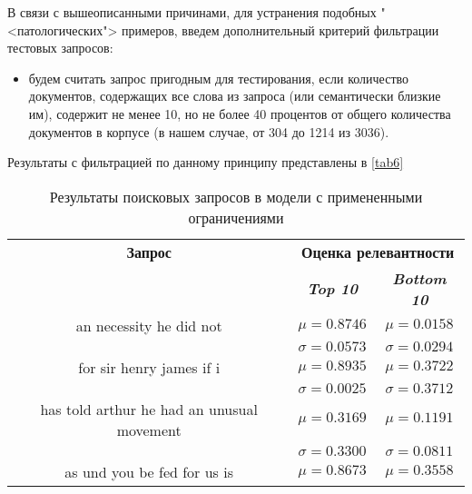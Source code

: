 В связи с вышеописанными причинами, для устранения подобных "<патологических"> примеров, введем дополнительный критерий фильтрации тестовых
запросов:
\begin{itemize}
    \item будем считать запрос пригодным для тестирования, если количество документов, содержащих все слова из запроса (или семантически
          близкие им), содержит не менее 10, но не более 40 процентов от общего количества документов в корпусе (в нашем случае, от 304 до 1214
          из 3036).
\end{itemize}

Результаты с фильтрацией по данному принципу представлены в \ref{tab6} %
\begin{table}[tbp]
    \caption{Результаты поисковых запросов в модели с примененными ограничениями}
    \begin{center}
        \begin{tabular}{ccc}
            \toprule
            \textbf{Запрос} & \multicolumn{2}{c}{\textbf{Оценка релевантности}}                               \\
                            & \textbf{\textit{Top 10}}                          & \textbf{\textit{Bottom 10}} \\
            \midrule
            an necessity   he did not                 & \(\mu=0.8746\)                                    & \(\mu=0.0158\)              \\
                                                      & \(\sigma=0.0573\)                                 & \(\sigma=0.0294\)           \\
            \midrule
            for sir henry james  if i                 & \(\mu=0.8935\)                                    & \(\mu=0.3722\)              \\
                                                      & \(\sigma=0.0025\)                                 & \(\sigma=0.3712\)           \\
            \midrule
            has told arthur he had an unusual movement& \(\mu=0.3169\)                                    & \(\mu=0.1191\)              \\
                                                      & \(\sigma=0.3300\)                                 & \(\sigma=0.0811\)           \\
            \midrule
            as und you be fed for us is               & \(\mu=0.8673\)                                    & \(\mu=0.3558\)              \\

\end{tabular}
\end{center}
\end{table}
